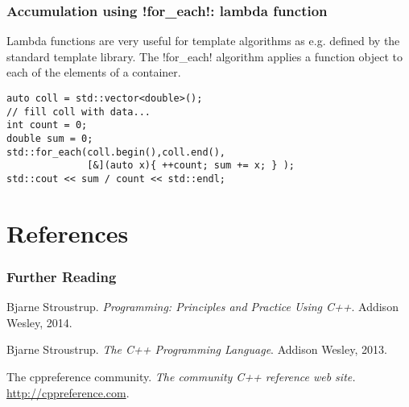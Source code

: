 \begin{frame}[fragile] \frametitle{Accumulation using
    \inline!for_each!: lambda function}

Lambda functions are very useful for template algorithms as e.g. defined by the standard template library. The \inline!for_each! algorithm applies a function object to each of the elements of a container.

\vspace*{2em}

  \begin{lstlisting}
auto coll = std::vector<double>();
// fill coll with data...
int count = 0;
double sum = 0;
std::for_each(coll.begin(),coll.end(),
              [&](auto x){ ++count; sum += x; } );
std::cout << sum / count << std::endl;
  \end{lstlisting}
\end{frame}



\section{References}

\begin{frame} \frametitle<presentation>{Further Reading}

\begin{thebibliography}{Vandervoorde and Josuttis(2003)}

Bjarne Stroustrup.
\newblock \emph{Programming: Principles and Practice Using C++}.
\newblock Addison Wesley, 2014.

Bjarne Stroustrup.
\newblock \emph{The C++ Programming Language}.
\newblock Addison Wesley, 2013.

The cppreference community.
\newblock \emph{The community C++ reference web site.}
\newblock \alert<2>{\url{http://cppreference.com}}.

\end{thebibliography}
\end{frame}



